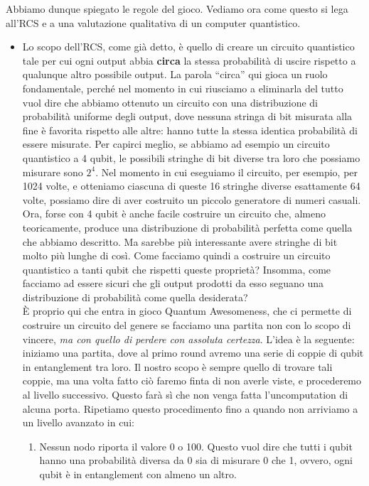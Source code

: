 \documentclass{book}
\theoremstyle{definition}
\theoremstyle{definition}
\theoremstyle{definition}
\theoremstyle{plain}
\theoremstyle{plain}
\theoremstyle{plain}
\theoremstyle{plain}
\begin{document}
Abbiamo dunque spiegato le regole del gioco. Vediamo ora come questo si lega all'RCS e a una valutazione qualitativa di un computer quantistico.
\begin{itemize}
    \item Lo scopo dell'RCS, come già detto, è quello di creare un circuito quantistico tale per cui ogni output abbia \textbf{circa} la stessa probabilità di uscire rispetto a qualunque altro possibile output. La parola ``circa'' qui gioca un ruolo fondamentale, perché nel momento in cui riusciamo a eliminarla del tutto vuol dire che abbiamo ottenuto un circuito con una distribuzione di probabilità uniforme degli output, dove nessuna stringa di bit misurata alla fine è favorita rispetto alle altre: hanno tutte la stessa identica probabilità di essere misurate. Per capirci meglio, se abbiamo ad esempio un circuito quantistico a 4 qubit, le possibili stringhe di bit diverse tra loro che possiamo misurare sono $2^{4}$. Nel momento in cui eseguiamo il circuito, per esempio, per 1024 volte, e otteniamo ciascuna di queste 16 stringhe diverse esattamente 64 volte, possiamo dire di aver costruito un piccolo generatore di numeri casuali. Ora, forse con 4 qubit è anche facile costruire un circuito che, almeno teoricamente, produce una distribuzione di probabilità perfetta come quella che abbiamo descritto. Ma sarebbe più interessante avere stringhe di bit molto più lunghe di così. Come facciamo quindi a costruire un circuito quantistico a tanti qubit che rispetti queste proprietà? Insomma, come facciamo ad essere sicuri che gli output prodotti da esso seguano una distribuzione di probabilità come quella desiderata?\\
    È proprio qui che entra in gioco Quantum Awesomeness, che ci permette di costruire un circuito del genere se facciamo una partita non con lo scopo di vincere, \emph{ma con quello di perdere con assoluta certezza}. L'idea è la seguente: iniziamo una partita, dove al primo round avremo una serie di coppie di qubit in entanglement tra loro. Il nostro scopo è sempre quello di trovare tali coppie, ma una volta fatto ciò faremo finta di non averle viste, e procederemo al livello successivo. Questo farà sì che non venga fatta l'uncomputation di alcuna porta. Ripetiamo questo procedimento fino a quando non arriviamo a un livello avanzato in cui:
    \begin{enumerate}
        \item Nessun nodo riporta il valore 0 o 100. Questo vuol dire che tutti i qubit hanno una probabilità diversa da 0 sia di misurare 0 che 1, ovvero, ogni qubit è in entanglement con almeno un altro.

\end{enumerate}
\end{itemize}
\end{document}
